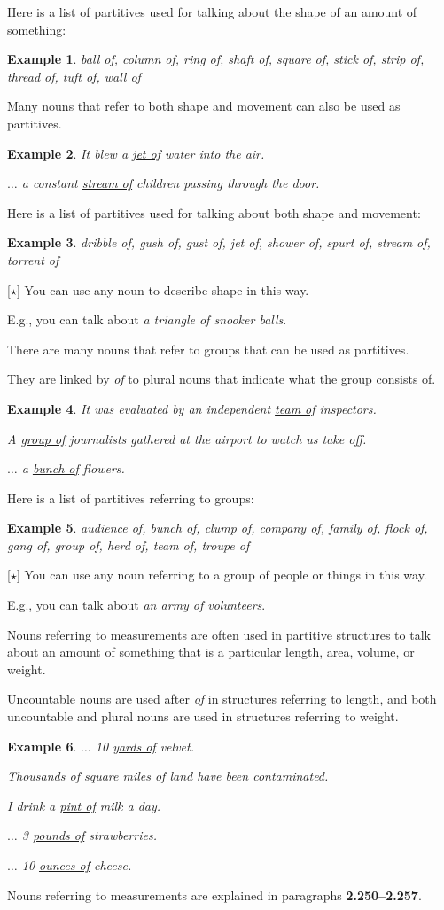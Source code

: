 \documentclass[oneside]{book}
\numberwithin{equation}{section}
\newtheorem{example}{Example}[section]
\begin{document}
Here is a list of partitives used for talking about the shape of an amount of something:
\begin{example}
    ball of, column of, ring of, shaft of, square of, stick of, strip of, thread of, tuft of, wall of
\end{example}
Many nouns that refer to both shape and movement can also be used as partitives.
\begin{example}
    It blew a \underline{jet of} water into the air.
    
    $\ldots$ a constant \underline{stream of} children passing through the door.
\end{example}
Here is a list of partitives used for talking about both shape and movement:
\begin{example}
    dribble of, gush of, gust of, jet of, shower of, spurt of, stream of, torrent of
\end{example}
%
[$\star$] You can use any noun to describe shape in this way.

E.g., you can talk about \textit{a triangle of snooker balls}.

\noindent{} There are many nouns that refer to groups that can be used as partitives.

They are linked by \textit{of} to plural nouns that indicate what the group consists of.
\begin{example}
    It was evaluated by an independent \underline{team of} inspectors.
    
    A \underline{group of} journalists gathered at the airport to watch us take off.
    
    $\ldots$ a \underline{bunch of} flowers.
\end{example}
Here is a list of partitives referring to groups:
\begin{example}
    audience of, bunch of, clump of, company of, family of, flock of, gang of, group of, herd of, team of, troupe of
\end{example}
[$\star$] You can use any noun referring to a group of people or things in this way.

E.g., you can talk about \textit{an army of volunteers}.

%
\noindent{} Nouns referring to measurements are often used in partitive structures to talk about an amount of something that is a particular length, area, volume, or weight.

Uncountable nouns are used after \textit{of} in structures referring to length, and both uncountable and plural nouns are used in structures referring to weight.
\begin{example}
    $\ldots$ 10 \underline{yards of} velvet.
    
    Thousands of \underline{square miles of} land have been contaminated.
    
    I drink a \underline{pint of} milk a day.
    
    $\ldots$ 3 \underline{pounds of} strawberries.
    
    $\ldots$ 10 \underline{ounces of} cheese.
\end{example}
Nouns referring to measurements are explained in paragraphs \textbf{2.250--2.257}.
\end{document}
